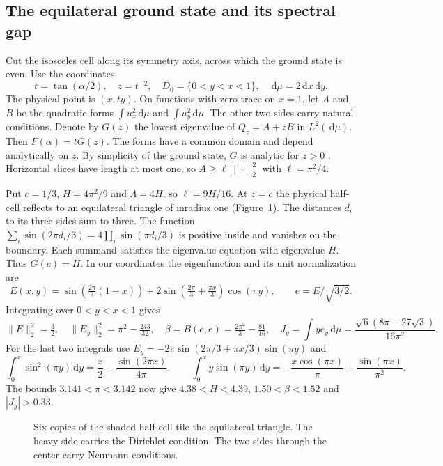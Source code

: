 \documentclass[11pt,a4paper,reqno]{amsart}
\theoremstyle{remark}
\numberwithin{equation}{section}
\newcommand{\dd}{\,\mathrm d}
\begin{document}
\subsection{The equilateral ground state and its spectral gap}\label{sec:equispec}
Cut the isosceles cell along its symmetry axis, across which the ground state
is even. Use the coordinates
\[
 t=\tan(\alpha/2),\quad z=t^{-2},\quad
 D_0=\{0<y<x<1\},\quad \dd\mu=2\dd x\dd y .
\]
The physical point is $(x,ty)$. On functions with zero trace on $x=1$, let
$A$ and $B$ be the quadratic forms $\int u_x^2\dd\mu$ and $\int u_y^2\dd\mu$.
The other two sides carry natural conditions. Denote by $G(z)$ the lowest
eigenvalue of $Q_z=A+zB$ in $L^2(\dd\mu)$. Then $F(\alpha)=tG(z)$. The forms
have a common domain and depend analytically on $z$. By simplicity of the
ground state, $G$ is analytic for $z>0$ \cite{kato}. Horizontal slices have
length at most one, so $A\ge\ell\|\cdot\|_2^2$ with $\ell=\pi^2/4$.

Put $c=1/3$, $H=4\pi^2/9$ and $\Lambda=4H$, so $\ell=9H/16$. At $z=c$ the
physical half-cell reflects to an equilateral triangle of inradius one
(Figure~\ref{fig:equilateral}). The distances $d_i$ to its three sides sum
to three. The function
$\sum_i\sin(2\pi d_i/3)=4\prod_i\sin(\pi d_i/3)$ is positive inside and
vanishes on the boundary. Each summand satisfies the eigenvalue equation
with eigenvalue $H$. Thus $G(c)=H$. In our coordinates the eigenfunction
and its unit normalization are
\[
 E(x,y)=\sin\!\left(\tfrac{2\pi}{3}(1-x)\right)
    +2\sin\!\left(\tfrac{2\pi}{3}+\tfrac{\pi x}{3}\right)\cos(\pi y),
 \qquad e=E/\sqrt{3/2}.
\]
Integrating over $0<y<x<1$ gives
\begin{equation}\label{eq:e-data}
 \|E\|_2^2=\tfrac32,\quad \|E_y\|_2^2=\pi^2-\tfrac{243}{32},\quad
 \beta=B(e,e)=\tfrac{2\pi^2}{3}-\tfrac{81}{16},\quad
 J_y=\int y e_y\dd\mu=\frac{\sqrt6(8\pi-27\sqrt3)}{16\pi^2}.
\end{equation}
For the last two integrals use $E_y=-2\pi\sin(2\pi/3+\pi x/3)\sin(\pi y)$ and
\[
 \int_0^x\sin^2(\pi y)\dd y=\frac x2-\frac{\sin(2\pi x)}{4\pi},\qquad
 \int_0^x y\sin(\pi y)\dd y=-\frac{x\cos(\pi x)}\pi+\frac{\sin(\pi x)}{\pi^2}.
\]
The bounds $3.141<\pi<3.142$ now give $4.38<H<4.39$, $1.50<\beta<1.52$
and $|J_y|>0.33$.

\begin{figure}[htbp]
\centering
{}
\caption{Six copies of the shaded half-cell tile the equilateral triangle.
The heavy side carries the Dirichlet condition. The two sides through the
center carry Neumann conditions.}\label{fig:equilateral}
\end{figure}
\end{document}
